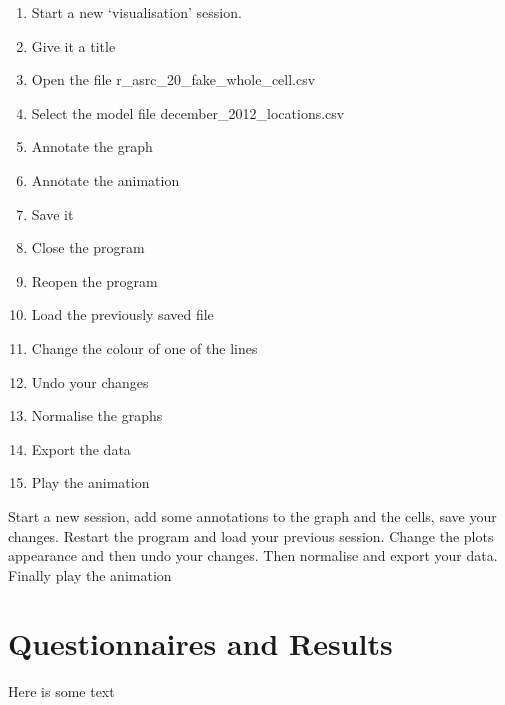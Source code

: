 \begin{enumerate}
\item Start a new `visualisation' session.
\item Give it a title
\item Open the file r\_asrc\_20\_fake\_whole\_cell.csv
\item Select the model file december\_2012\_locations.csv
\item Annotate the graph
\item Annotate the animation
\item Save it
\item Close the program
\item Reopen the program
\item Load the previously saved file
\item Change the colour of one of the lines
\item Undo your changes
\item Normalise the graphs
\item Export the data
\item Play the animation
\end{enumerate}

Start a new session, add some annotations to the graph and the cells, save your changes.  Restart the program and load your previous session.  Change the plots appearance and then undo your changes.  Then normalise and export your data.  Finally play the animation

\clearpage

\section{Questionnaires and Results}
\label{sec:qs}

Here is some text



